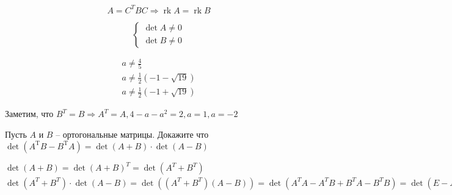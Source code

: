 \begin{solution}
	$$
	A=C^{T} B C
	\Longrightarrow 
	\operatorname{r k} A=\operatorname{r k} B
	$$
	
	$$
	\left\{\begin{array}{l}{\operatorname{det} A \neq 0} \\ {\operatorname{det} B \neq 0}\end{array}\right.
	$$
	
	$$
	\begin{array}{l}{a \neq \frac{4}{5}} \\ {a \neq \frac{1}{2}(-1-\sqrt{19})} \\ {a \neq \frac{1}{2}(-1+\sqrt{19})}\end{array}
	$$
	
	Заметим, что  $
	B^{T}=B \Longrightarrow 
	A^{T}=A , 
	4-a-a^{2}=2 , a = 1 , a = -2	
	$
\end{solution}


	
	
\begin{problem}
	Пусть $ A $ и $ B $ -- ортогональные матрицы. Докажите что 
	$ \displaystyle
	 \operatorname{det}\left(A^{\mathrm{T}} B-B^{\mathrm{T}} A\right)=\operatorname{det}(A+B) \cdot \operatorname{det}(A-B)
	$
\end{problem}

\begin{solution}
	$
	\operatorname{det}(A+B)=\operatorname{det}(A+B)^{T}=\operatorname{det}\left(A^{T}+B^{T}\right)
	$
	\\
	$ 
	\operatorname{det}\left(A^{T}+B^{T}\right) \cdot \operatorname{det}(A-B)= \operatorname{det}(\left(A^{ T}+B^{T}\right)(A-B)) = \operatorname{det}\left(A^{T} A-A^{T} B+B^{T} A-B^{T} B\right) = \operatorname{det}\left(E-A^{T} B+B^{T} A-E\right) = 
	\operatorname{det}\left(B^{T} A-A^{T} B\right) = \operatorname{det}\left(B^{T} A-A^{T} B\right)^{T}=
	\operatorname{det}\left(A^{T} B-B^{T} A\right)
	$
\end{solution}		


				